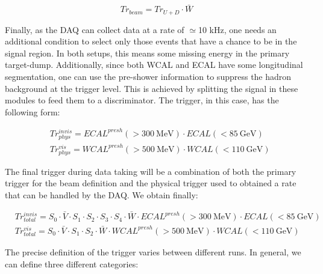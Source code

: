 \begin{equation}
\label{eq:trigger-beam}
Tr_{beam} = Tr_{U+D} \cdot \bar{W}
\end{equation}

Finally, as the DAQ can collect data at a rate of $\simeq$10 \si{kHz}, one needs an additional condition to select only those events that have a chance to be in the signal region. In both setups, this means some missing energy in the primary target-dump. Additionally, since both WCAL and ECAL have some longitudinal segmentation, one can use the pre-shower information to suppress the hadron background at the trigger level. This is achieved by splitting the signal in these modules to feed them to a discriminator. The trigger, in this case, has the following form:

\begin{equation}
\label{eq:trigger-phys}
\begin{split}
& Tr^{invis}_{phys} = ECAL^{presh}(> \SI{300}{\mega\electronvolt}) \cdot ECAL(<\SI{85}{\giga\electronvolt})\\
& Tr^{vis}_{phys} = WCAL^{presh}(>\SI{500}{\mega\electronvolt}) \cdot WCAL(<\SI{110}{\giga\electronvolt})
\end{split}
\end{equation}

The final trigger during data taking will be a combination of both the primary trigger for the beam definition and the physical trigger used to obtained a rate that can be handled by the DAQ. We obtain finally:

\begin{equation}
\label{eq:trigger-total}
\begin{split}
& Tr^{invis}_{total} = S_0 \cdot \bar{V} \cdot S_1 \cdot S_2 \cdot S_3 \cdot S_4 \cdot \bar{W} \cdot ECAL^{presh}(> \SI{300}{\mega\electronvolt}) \cdot ECAL(<\SI{85}{\giga\electronvolt})\\
& Tr^{vis}_{total} = S_0 \cdot \bar{V} \cdot S_1 \cdot S_2\cdot \bar{W} \cdot WCAL^{presh}(>\SI{500}{\mega\electronvolt}) \cdot WCAL(<\SI{110}{\giga\electronvolt})
\end{split}
\end{equation}

The precise definition of the trigger varies between different runs. In general, we can define three different categories:

